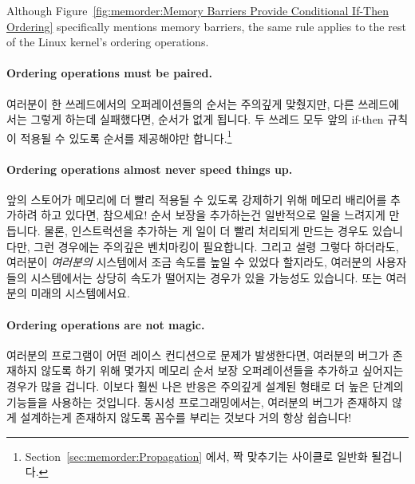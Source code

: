 Although
Figure~\ref{fig:memorder:Memory Barriers Provide Conditional If-Then Ordering}
specifically mentions memory barriers, the same rule applies to the
rest of the Linux kernel's ordering operations.
\fi

\paragraph{Ordering operations must be paired.}
여러분이 한 쓰레드에서의 오퍼레이션들의 순서는 주의깊게 맞췄지만, 다른
쓰레드에서는 그렇게 하는데 실패했다면, 순서가 없게 됩니다.
두 쓰레드 모두 앞의 if-then 규칙이 적용될 수 있도록 순서를 제공해야만
합니다.\footnote{
	Section~\ref{sec:memorder:Propagation} 에서, 짝 맞추기는 사이클로
	일반화 될겁니다.}

\paragraph{Ordering operations almost never speed things up.}
앞의 스토어가 메모리에 더 빨리 적용될 수 있도록 강제하기 위해 메모리 배리어를
추가하려 하고 있다면, 참으세요!
순서 보장을 추가하는건 일반적으로 일을 느려지게 만듭니다.
물론, 인스트럭션을 추가하는 게 일이 더 빨리 처리되게 만드는 경우도 있습니다만,
그런 경우에는 주의깊은 벤치마킹이 필요합니다.
그리고 설령 그렇다 하더라도, 여러분이 \emph{여러분의} 시스템에서 조금 속도를
높일 수 있었다 할지라도, 여러분의 사용자들의 시스템에서는 상당히 속도가
떨어지는 경우가 있을 가능성도 있습니다.
또는 여러분의 미래의 시스템에서요.

\paragraph{Ordering operations are not magic.}
여러분의 프로그램이 어떤 레이스 컨디션으로 문제가 발생한다면, 여러분의 버그가
존재하지 않도록 하기 위해 몇가지 메모리 순서 보장 오퍼레이션들을 추가하고
싶어지는 경우가 많을 겁니다.
이보다 훨씬 나은 반응은 주의깊게 설계된 형태로 더 높은 단계의 기능들을 사용하는
것입니다.
동시성 프로그래밍에서는, 여러분의 버그가 존재하지 않게 설계하는게 존재하지
않도록 꼼수를 부리는 것보다 거의 항상 쉽습니다!
\iffalse

